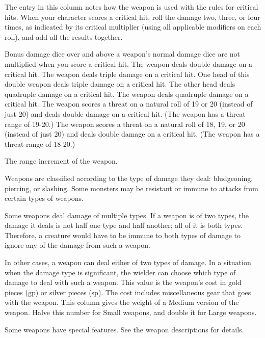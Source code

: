  The entry in this column notes how the weapon is used with the rules for critical hits. When your character scores a critical hit, roll the damage two, three, or four times, as indicated by its critical multiplier (using all applicable modifiers on each roll), and add all the results together.

 Bonus damage dice over and above a weapon's normal damage dice are not multiplied when you score a critical hit.
 The weapon deals double damage on a critical hit.
 The weapon deals triple damage on a critical hit.
 One head of this double weapon deals triple damage on a critical hit. The other head deals quadruple damage on a critical hit.
 The weapon deals quadruple damage on a critical hit.
 The weapon scores a threat on a natural roll of 19 or 20 (instead of just 20) and deals double damage on a critical hit. (The weapon has a threat range of 19-20.)
 The weapon scores a threat on a natural roll of 18, 19, or 20 (instead of just 20) and deals double damage on a critical hit. (The weapon has a threat range of 18-20.)

 The range increment of the weapon.

 Weapons are classified according to the type of damage they deal: bludgeoning, piercing, or slashing. Some monsters may be resistant or immune to attacks from certain types of weapons.

Some weapons deal damage of multiple types. If a weapon is of two types, the damage it deals is not half one type and half another; all of it is both types. Therefore, a creature would have to be immune to both types of damage to ignore any of the damage from such a weapon.

In other cases, a weapon can deal either of two types of damage. In a situation when the damage type is significant, the wielder can choose which type of damage to deal with such a weapon.
 This value is the weapon's cost in gold pieces (gp) or silver pieces (sp). The cost includes miscellaneous gear that goes with the weapon.
 This column gives the weight of a Medium version of
the weapon. Halve this number for Small weapons, and double it for
Large weapons.

 Some weapons have special features. See the weapon
descriptions for details.

